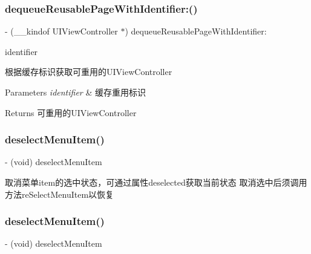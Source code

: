 \subsubsection{\texorpdfstring{dequeue\+Reusable\+Page\+With\+Identifier\+:()}{dequeueReusablePageWithIdentifier:()}\hspace{0.1cm}{\footnotesize\ttfamily [3/3]}}
{\footnotesize\ttfamily -\/ (\+\_\+\+\_\+kindof U\+I\+View\+Controller $\ast$) dequeue\+Reusable\+Page\+With\+Identifier\+: \begin{DoxyParamCaption}\item[{(N\+S\+String $\ast$)}]{identifier }\end{DoxyParamCaption}}

根据缓存标识获取可重用的\+U\+I\+View\+Controller


\begin{DoxyParams}{Parameters}
{\em identifier} & 缓存重用标识\\
\hline
\end{DoxyParams}
\begin{DoxyReturn}{Returns}
可重用的\+U\+I\+View\+Controller 
\end{DoxyReturn}
\mbox{\label{interface_v_t_magic_view_a0e92cac6b3957cfc432779b9e9fd953f}} 
\subsubsection{\texorpdfstring{deselect\+Menu\+Item()}{deselectMenuItem()}\hspace{0.1cm}{\footnotesize\ttfamily [1/3]}}
{\footnotesize\ttfamily -\/ (void) deselect\+Menu\+Item \begin{DoxyParamCaption}{ }\end{DoxyParamCaption}}

取消菜单item的选中状态，可通过属性deselected获取当前状态 取消选中后须调用方法re\+Select\+Menu\+Item以恢复 \mbox{\label{interface_v_t_magic_view_a0e92cac6b3957cfc432779b9e9fd953f}} 
\subsubsection{\texorpdfstring{deselect\+Menu\+Item()}{deselectMenuItem()}\hspace{0.1cm}{\footnotesize\ttfamily [2/3]}}
{\footnotesize\ttfamily -\/ (void) deselect\+Menu\+Item \begin{DoxyParamCaption}{ }\end{DoxyParamCaption}}

